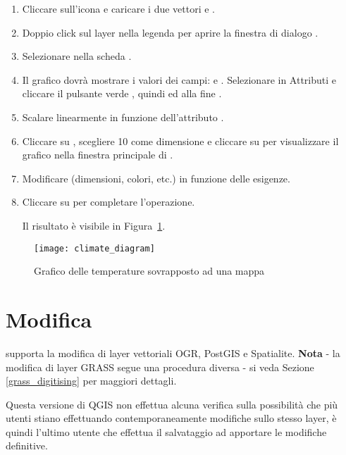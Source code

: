 \begin{enumerate}
\item Cliccare sull'icona  e 
caricare i due vettori  e .
\item Doppio click sul layer  nella legenda per aprire la finestra di dialogo 
.
\item Selezionare  nella scheda .
\item Il grafico dovrà mostrare i valori dei campi:
 e . Selezionare
 in Attributi e cliccare il pulsante verde \button{+}, quindi
 ed alla fine .
\item Scalare linearmente in funzione dell'attributo .
\item Cliccare su , scegliere 10 come dimensione e cliccare 
su  per visualizzare il grafico nella finestra principale di \qg.
\item Modificare (dimensioni, colori, etc.) in funzione delle esigenze.
\item Cliccare su  per completare l'operazione.

Il risultato è visibile in Figura~\ref{fig:climatediagram}.

\end{enumerate}

\begin{figure}[ht]
   \centering
   \texttt{[image: climate\_diagram]}
   \caption{Grafico delle temperature sovrapposto ad una mappa \nixcaption}
   \label{fig:climatediagram}
\end{figure}

\section{Modifica}

\qg supporta la modifica di layer vettoriali OGR, PostGIS e Spatialite. 
\textbf{Nota} - la modifica di layer GRASS segue una procedura diversa - 
si veda Sezione \ref{grass_digitising} per maggiori dettagli. 

\begin{Tip}\caption{\textsc{Modifiche concorrenti}}
Questa versione di QGIS non effettua alcuna verifica sulla possibilità che più 
utenti stiano effettuando contemporaneamente modifiche sullo stesso layer, è quindi 
l'ultimo utente che effettua il salvataggio ad apportare le modifiche definitive.
\end{Tip}


